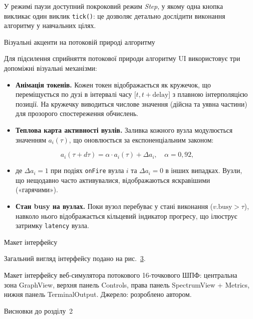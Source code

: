 У режимі паузи доступний покроковий режим \emph{Step}, у якому одна
кнопка викликає один виклик \texttt{tick()}: це дозволяє детально
дослідити виконання алгоритму у навчальних цілях.

Візуальні акценти на потоковій природі алгоритму

Для підсилення сприйняття потокової природи алгоритму UI використовує
три допоміжні візуальні механізми:

\begin{itemize}
\item
  \textbf{Анімація токенів.} Кожен токен відображається як кружечок, що
  переміщується по дузі в інтервалі часу
  \(\lbrack t,t + \text{delay}\rbrack\) з плавною інтерполяцією позиції.
  На кружечку виводиться числове значення (дійсна та уявна частини) для
  прозорого спостереження обчислень.
\item
  \textbf{Теплова карта активності вузлів.} Заливка кожного вузла
  модулюється значенням \(a_{i}(\tau)\), що оновлюється за
  експоненціальним законом:
\end{itemize}

\[a_{i}(\tau + d\tau) = \alpha \cdot a_{i}(\tau) + \Delta a_{i},\quad\alpha = 0,92,\]

\begin{itemize}
\item
  де \(\Delta a_{i} = 1\) при подіях \texttt{onFire} вузла \(i\) та
  \(\Delta a_{i} = 0\) в інших випадках. Вузли, що нещодавно часто
  активувалися, відображаються яскравішими («гарячими»).
\end{itemize}

\begin{itemize}
\item
  \textbf{Стан busy на вузлах.} Поки вузол перебуває у стані виконання
  (\(v.\text{busy} > \tau\)), навколо нього відображається кільцевий
  індикатор прогресу, що ілюструє затримку \texttt{latency} вузла.
\end{itemize}

Макет інтерфейсу

Загальний вигляд інтерфейсу подано на рис.~\hyperref[fig:ui]{3}.

\protect{}\label{fig:ui}{}Макет інтерфейсу веб-симулятора
потокового 16-точкового ШПФ: центральна зона GraphView, верхня панель
Controls, права панель SpectrumView + Metrics, нижня панель
TerminalOutput. Джерело: розроблено автором.

\protect{}\label{_Toc228121478}{}Висновки до розділу~2

